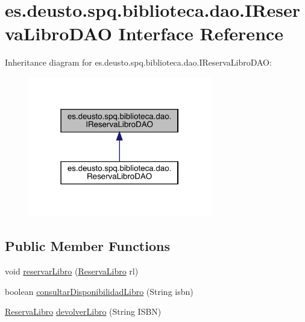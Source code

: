 \hypertarget{interfacees_1_1deusto_1_1spq_1_1biblioteca_1_1dao_1_1_i_reserva_libro_d_a_o}{}\section{es.\+deusto.\+spq.\+biblioteca.\+dao.\+I\+Reserva\+Libro\+D\+AO Interface Reference}
\label{interfacees_1_1deusto_1_1spq_1_1biblioteca_1_1dao_1_1_i_reserva_libro_d_a_o}


Inheritance diagram for es.\+deusto.\+spq.\+biblioteca.\+dao.\+I\+Reserva\+Libro\+D\+AO\+:
\nopagebreak
\begin{figure}[H]
\begin{center}
\leavevmode
\includegraphics[width=226pt]{interfacees_1_1deusto_1_1spq_1_1biblioteca_1_1dao_1_1_i_reserva_libro_d_a_o__inherit__graph}
\end{center}
\end{figure}
\subsection*{Public Member Functions}
\begin{DoxyCompactItemize}
\item 
void \mbox{\hyperlink{interfacees_1_1deusto_1_1spq_1_1biblioteca_1_1dao_1_1_i_reserva_libro_d_a_o_a9cd1320b865754765042c3421a3bf1a0}{reservar\+Libro}} (\mbox{\hyperlink{classes_1_1deusto_1_1spq_1_1biblioteca_1_1data_1_1_reserva_libro}{Reserva\+Libro}} rl)
\item 
boolean \mbox{\hyperlink{interfacees_1_1deusto_1_1spq_1_1biblioteca_1_1dao_1_1_i_reserva_libro_d_a_o_a56903b304697f889b59fb782a4e61aaf}{consultar\+Disponibilidad\+Libro}} (String isbn)
\item 
\mbox{\hyperlink{classes_1_1deusto_1_1spq_1_1biblioteca_1_1data_1_1_reserva_libro}{Reserva\+Libro}} \mbox{\hyperlink{interfacees_1_1deusto_1_1spq_1_1biblioteca_1_1dao_1_1_i_reserva_libro_d_a_o_a3a772c69bb728d2e32b1767101a05efd}{devolver\+Libro}} (String I\+S\+BN)
\end{DoxyCompactItemize}


